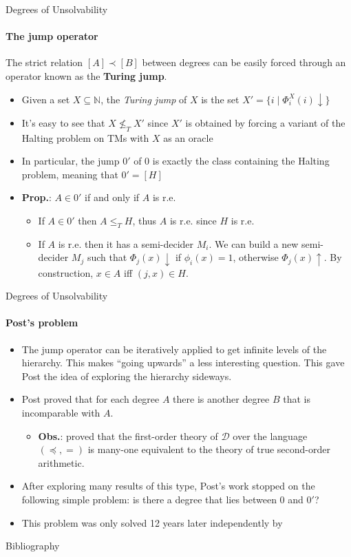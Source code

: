 \documentclass{beamer}
\newcommand{\N}{\mathbb{N}}                     %
\newcommand{\curlyquotes}[1]{\textquotedblleft #1\textquotedblright}
\begin{document}
\begin{frame}{Degrees of Unsolvability}
\framesubtitle{The jump operator}
    The strict relation $[A] \prec [B]$ between degrees can be easily forced through an operator known as the \textbf{Turing jump}.
    \begin{itemize}[<+->]
        \item Given a set $X \subseteq \N$, the \textit{Turing jump} of $X$ is the set $X' = \{i \mid \Phi_i^X(i) \downarrow\}$
        \item It's easy to see that $X \not\leq_T X'$ since $X'$ is obtained by forcing a variant of the Halting problem on TMs with $X$ as an oracle
        \item In particular, the jump $0'$ of $0$ is exactly the class containing the Halting problem, meaning that $0' = [H]$
        \item \textbf{Prop.}: $A \in 0'$ if and only if $A$ is r.e.
        \begin{itemize}
            \item If $A \in 0'$ then $A \leq_T H$, thus $A$ is r.e. since $H$ is r.e.
            \item If $A$ is r.e. then it has a semi-decider $M_i$. We can build a new semi-decider $M_j$ such that $\Phi_j(x) \downarrow$ if $\phi_i(x) = 1$, otherwise $\Phi_j(x) \uparrow$. By construction, $x \in A$ iff $(j,x) \in H$. 
        \end{itemize}
    \end{itemize}
\end{frame}

\begin{frame}{Degrees of Unsolvability}
\framesubtitle{Post's problem}
    \begin{itemize}[<+->]
        \item The jump operator can be iteratively applied to get infinite levels of the hierarchy. This makes \curlyquotes{going upwards} a less interesting question. This gave Post the idea of exploring the hierarchy sideways.

        \item Post proved that for each degree $A$ there is another degree $B$ that is incomparable with $A$.
        \begin{itemize}
            \item \textbf{Obs.}: \textcite{simpson} proved that the first-order theory of $\mathcal{D}$ over the language $(\preceq, = )$ is many-one equivalent to the theory of true second-order arithmetic. 
        \end{itemize}

        \item After exploring many results of this type, Post's work stopped on the following simple problem: is there a degree that lies between $0$ and $0'$?

        \item This problem was only solved 12 years later independently by \textcite{friedberg, muchnik}
    \end{itemize}
\end{frame}
    
\begin{frame}{Bibliography}
\framesubtitle{{}}
    \printbibliography
\end{frame}
\end{document}
